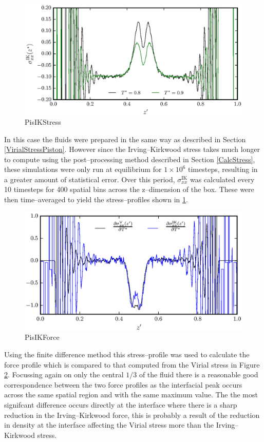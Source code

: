 \begin{figure}[h]
\centering
\includegraphics[scale=0.8]{PisIKStress}
\caption{PisIKStress}
\label{PisIKStress}
\end{figure}
In this case the fluids were prepared in the same way as described in Section \ref{VirialStressPiston}.
However since the Irving--Kirkwood stress takes much longer to compute using the post--processing method described in Section \ref{CalcStress}, these simulations were only run at equilibrium for $1 \times 10^{6}$ timesteps, resulting in a greater amount of statistical error.
Over this period, $\sigma^{\mathrm{IK}}_{xx}$ was calculated every 10 timesteps for 400 spatial bins across the z--dimension of the box. 
These were then time--averaged to yield the stress--profiles shown in \ref{PisIKStress}.
\FloatBarrier

\begin{figure}[h]
\centering
\includegraphics[scale=0.8]{PisIKForce}
\caption{PisIKForce}
\label{PisIKForce}
\end{figure}
Using the finite difference method this stress--profile was used to calculate the force profile which is compared to that computed from the Virial stress in Figure \ref{PisIKForce}.
Focussing again on only the central $1/3$ of the fluid there is a reasonable good correspondence between the two force profiles as the interfacial peak occurs across the same spatial region and with the same maximum value.
The the most signifcant difference occurs directly at the interface where there is a sharp reduction in the Irving--Kirkwood force, this is probably a result of the reduction in density at the interface affecting the Virial stress more than the Irving--Kirkwood stress.
\FloatBarrier

